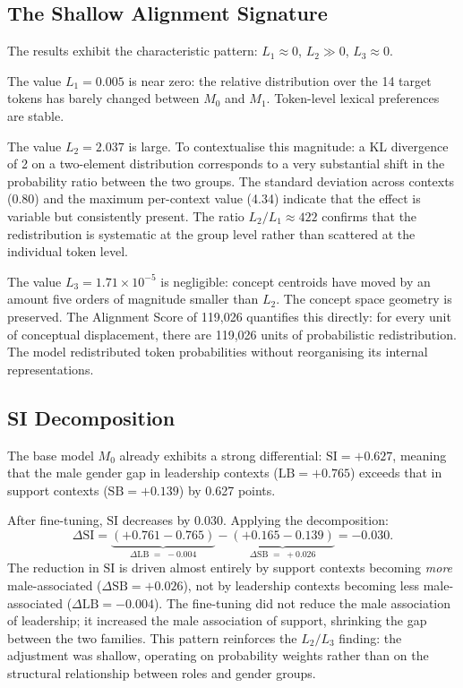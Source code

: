 \documentclass[11pt,a4paper]{article}
\begin{document}
\subsection{The Shallow Alignment Signature}

The results exhibit the characteristic pattern: $L_1 \approx 0$, $L_2 \gg 0$,
$L_3 \approx 0$.

The value $L_1 = 0.005$ is near zero: the relative distribution over the 14 target tokens
has barely changed between $M_0$ and $M_1$. Token-level lexical preferences are stable.

The value $L_2 = 2.037$ is large. To contextualise this magnitude: a KL divergence of 2
on a two-element distribution corresponds to a very substantial shift in the probability
ratio between the two groups. The standard deviation across contexts (0.80) and the
maximum per-context value (4.34) indicate that the effect is variable but consistently
present. The ratio $L_2/L_1 \approx 422$ confirms that the redistribution is systematic at
the group level rather than scattered at the individual token level.

The value $L_3 = 1.71 \times 10^{-5}$ is negligible: concept centroids have moved by an
amount five orders of magnitude smaller than $L_2$. The concept space geometry is
preserved. The Alignment Score of 119,026 quantifies this directly: for every unit of
conceptual displacement, there are 119,026 units of probabilistic redistribution. The model
redistributed token probabilities without reorganising its internal representations.

\subsection{SI Decomposition}

The base model $M_0$ already exhibits a strong differential: $\mathrm{SI} = +0.627$,
meaning that the male gender gap in leadership contexts ($\mathrm{LB} = +0.765$) exceeds
that in support contexts ($\mathrm{SB} = +0.139$) by 0.627 points.

After fine-tuning, $\mathrm{SI}$ decreases by 0.030. Applying the decomposition:
\[
  \Delta\mathrm{SI}
  = \underbrace{(+0.761 - 0.765)}_{\Delta\mathrm{LB}\;=\;-0.004}
  - \underbrace{(+0.165 - 0.139)}_{\Delta\mathrm{SB}\;=\;+0.026}
  = -0.030.
\]
The reduction in $\mathrm{SI}$ is driven almost entirely by support contexts becoming
\emph{more} male-associated ($\Delta\mathrm{SB} = +0.026$), not by leadership contexts
becoming less male-associated ($\Delta\mathrm{LB} = -0.004$). The fine-tuning did not
reduce the male association of leadership; it increased the male association of support,
shrinking the gap between the two families. This pattern reinforces the $L_2/L_3$
finding: the adjustment was shallow, operating on probability weights rather than on
the structural relationship between roles and gender groups.
\end{document}

